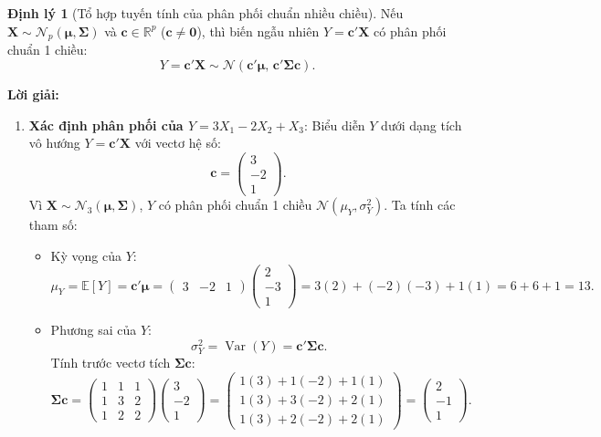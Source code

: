 \documentclass[11pt,a4paper]{article}
\newenvironment{solution}{%
  \par\noindent\textbf{Lời giải:}\ \ignorespaces
}{\par}
\theoremstyle{definition}
\newtheorem{thm}{Định lý}
\begin{document}
\begin{thm}[Tổ hợp tuyến tính của phân phối chuẩn nhiều chiều]
Nếu $\mathbf{X} \sim \mathcal{N}_p(\boldsymbol{\mu}, \boldsymbol{\Sigma})$ và $\mathbf{c} \in \mathbb{R}^p$ ($\mathbf{c} \neq \mathbf{0}$), thì biến ngẫu nhiên $Y = \mathbf{c}'\mathbf{X}$ có phân phối chuẩn 1 chiều:
\[
Y = \mathbf{c}'\mathbf{X} \sim \mathcal{N}\left(\mathbf{c}'\boldsymbol{\mu}, \, \mathbf{c}'\boldsymbol{\Sigma}\mathbf{c}\right).
\]
\end{thm}

\begin{solution}
\begin{enumerate}[label=\textbf{\alph*)}]
  \item \textbf{Xác định phân phối của $Y = 3X_1 - 2X_2 + X_3$}:
  Biểu diễn $Y$ dưới dạng tích vô hướng $Y = \mathbf{c}'\mathbf{X}$ với vectơ hệ số:
  \[
  \mathbf{c} = \begin{pmatrix} 3 \\ -2 \\ 1 \end{pmatrix}.
  \]
  Vì $\mathbf{X} \sim \mathcal{N}_3(\boldsymbol{\mu}, \boldsymbol{\Sigma})$, $Y$ có phân phối chuẩn 1 chiều $\mathcal{N}(\mu_Y, \sigma_Y^2)$. Ta tính các tham số:
  \begin{itemize}
    \item Kỳ vọng của $Y$:
    \[
    \mu_Y = \mathbb{E}[Y] = \mathbf{c}'\boldsymbol{\mu} = \begin{pmatrix} 3 & -2 & 1 \end{pmatrix} \begin{pmatrix} 2 \\ -3 \\ 1 \end{pmatrix} = 3(2) + (-2)(-3) + 1(1) = 6 + 6 + 1 = 13.
    \]
    \item Phương sai của $Y$:
    \[
    \sigma_Y^2 = \operatorname{Var}(Y) = \mathbf{c}'\boldsymbol{\Sigma}\mathbf{c}.
    \]
    Tính trước vectơ tích $\boldsymbol{\Sigma}\mathbf{c}$:
    \[
    \boldsymbol{\Sigma}\mathbf{c} = \begin{pmatrix} 1 & 1 & 1 \\ 1 & 3 & 2 \\ 1 & 2 & 2 \end{pmatrix} \begin{pmatrix} 3 \\ -2 \\ 1 \end{pmatrix} = \begin{pmatrix} 1(3) + 1(-2) + 1(1) \\ 1(3) + 3(-2) + 2(1) \\ 1(3) + 2(-2) + 2(1) \end{pmatrix} = \begin{pmatrix} 2 \\ -1 \\ 1 \end{pmatrix}.
\]
\end{itemize}
\end{enumerate}
\end{solution}
\end{document}
